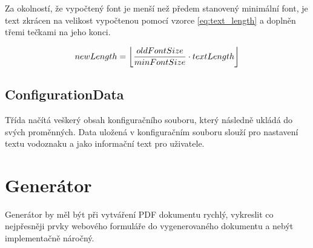 Za okolností, že vypočtený font je menší než předem stanovený minimální font, je text zkrácen na velikost vypočtenou pomocí vzorce  \eqref{eq:text_length} a doplněn třemi tečkami na jeho konci. 

\begin{equation}
newLength = \floor*{\frac{oldFontSize}{minFontSize} \cdot textLength} \label{eq:text_length}
\end{equation}
\subsection{ConfigurationData}
Třída načítá veškerý obsah konfiguračního souboru, který následně ukládá do svých proměnných. Data uložená v konfiguračním souboru slouží pro nastavení textu vodoznaku a jako informační text pro uživatele.
\section{Generátor}
Generátor by měl být při vytváření PDF dokumentu rychlý, vykreslit co nejpřesněji prvky webového formuláře do vygenerovaného dokumentu a nebýt implementačně náročný.
